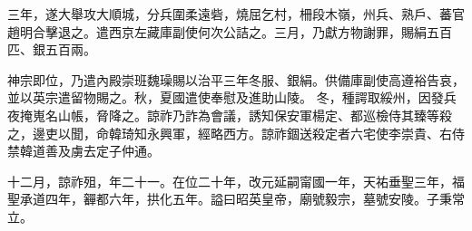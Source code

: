 \begin{pinyinscope}
 三年，遂大舉攻大順城，分兵圍柔遠砦，燒屈乞村，柵段木嶺，州兵、熟戶、蕃官趙明合擊退之。遣西京左藏庫副使何次公詰之。三月，乃獻方物謝罪，賜絹五百匹、銀五百兩。



 神宗即位，乃遣內殿崇班魏璪賜以治平三年冬服、銀絹。供備庫副使高遵裕告哀，並以英宗遣留物賜之。秋，夏國遣使奉慰及進助山陵。
 冬，種諤取綏州，因發兵夜掩嵬名山帳，脅降之。諒祚乃詐為會議，誘知保安軍楊定、都巡檢侍其臻等殺之，邊吏以聞，命韓琦知永興軍，經略西方。諒祚錮送殺定者六宅使李崇貴、右侍禁韓道善及虜去定子仲通。



 十二月，諒祚殂，年二十一。在位二十年，改元延嗣甯國一年，天祐垂聖三年，福聖承道四年，奲都六年，拱化五年。謚曰昭英皇帝，廟號毅宗，墓號安陵。子秉常立。



\end{pinyinscope}
